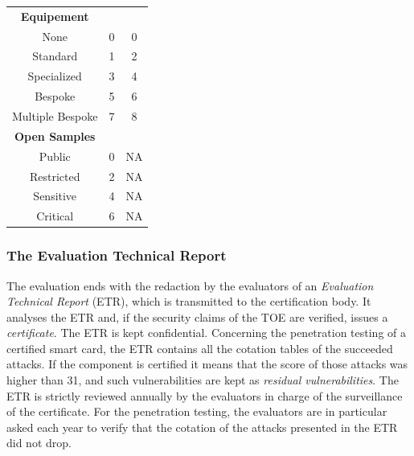 \begin{table}[]
\begin{tabular}{ccc}
\midrule
\textbf{Equipement}           &                &              \\
None                          & 0              & 0            \\
Standard                      & 1              & 2            \\
Specialized                   & 3              & 4            \\
Bespoke                       & 5              & 6            \\
Multiple Bespoke              & 7              & 8            \\
\midrule
\textbf{Open Samples}         &                &              \\
Public                        & 0              & NA           \\
Restricted                    & 2              & NA           \\
Sensitive                     & 4              & NA           \\
Critical                      & 6              & NA    \\	
\bottomrule      
\end{tabular}
\end{table}


\subsubsection{The Evaluation Technical Report}
The evaluation ends with the redaction by the evaluators of an \emph{Evaluation Technical Report} (ETR), which is transmitted to the certification body. It analyses the ETR and, if the security claims of the TOE are verified, issues a \emph{certificate}. The ETR is kept confidential. Concerning the penetration testing of a certified smart card, the ETR contains all the cotation tables of the succeeded attacks. If the component is certified it means that the score of those attacks was higher than 31, and such vulnerabilities are kept as \emph{residual vulnerabilities}. The ETR is strictly reviewed annually by the evaluators in charge of the surveillance of the certificate. For the penetration testing, the evaluators are in particular asked each year to verify that the cotation of the attacks presented in the ETR did not drop.

